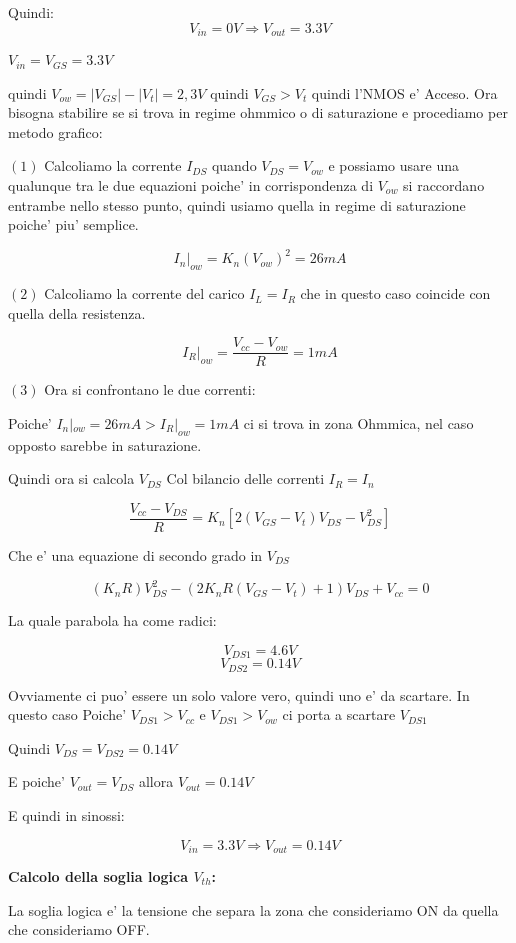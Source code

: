 \documentclass[\main/main.tex]{subfiles}
\begin{document}
Quindi:
 \[V_{in} = 0V \Rightarrow V_{out} = 3.3V\]
 

\textbf{$V_{in} = V_{GS} = 3.3V$}

quindi $V_{ow} = |V_{GS}| - |V_t| = 2,3V$ quindi $V_{GS} > V_t$ quindi l'NMOS e' Acceso.
Ora bisogna stabilire se si trova in regime ohmmico o di saturazione e procediamo per metodo grafico:

$(1)$ Calcoliamo la corrente $I_{DS}$ quando $V_{DS} = V_{ow}$ e possiamo usare una qualunque tra le due equazioni poiche' in corrispondenza di $V_{ow}$ si raccordano entrambe nello stesso punto, quindi usiamo quella in regime di saturazione poiche' piu' semplice.

\[I_n|_{ow} = K_n \left(V_{ow}\right)^2 = 26mA\]

$(2)$ Calcoliamo la corrente del carico $I_{L} = I_{R}$ che in questo caso coincide con quella della resistenza.

\[I_R|_{ow} = \frac{V_{cc} - V_{ow}}{R} = 1mA\]

$(3)$ Ora si confrontano le due correnti:

Poiche' $I_n|_{ow} = 26mA > I_R|_{ow} = 1mA$ ci si trova in zona Ohmmica, nel caso opposto sarebbe in saturazione.

Quindi ora si calcola $V_{DS}$ Col bilancio delle correnti $I_R = I_n$

\[\frac{V_{cc} - V_{DS}}{R} = K_n \left[ 2 \left(V_{GS} - V_t \right)V_{DS} - V_{DS}^2 \right]\]

Che e' una equazione di secondo grado in $V_{DS}$ 

\[\left(K_n R \right) V_{DS}^2 - \left(2K_nR\left(V_{GS}-V_t\right)+1\right)V_{DS}+V_{cc} = 0\]

La quale parabola ha come radici:

\[V_{DS1} = 4.6V \]
\[V_{DS2} = 0.14V \]

Ovviamente ci puo' essere un solo valore vero, quindi uno e' da scartare.
In questo caso Poiche' $V_{DS1} > V_{cc}$ e $V_{DS1} > V_{ow}$ ci porta a scartare $V_{DS1}$

Quindi $V_{DS} = V_{DS2} = 0.14V$

E poiche' $V_{out} = V_{DS}$ allora $V_{out} = 0.14V$

E quindi in sinossi:

\[V_{in} = 3.3V \Rightarrow V_{out} = 0.14V\]

\textbf{Calcolo della soglia logica $V_{th}$:}

La soglia logica e' la tensione che separa la zona che consideriamo ON da quella che consideriamo OFF.
\end{document}
